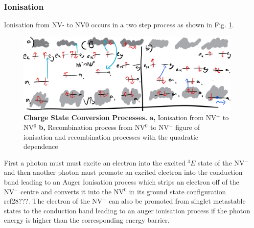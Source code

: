 \documentclass[preprint,prl]{revtex4}
\begin{document}
\subsubsection{Ionisation}
Ionisation from NV- to NV0 occurs in a two step process as shown in Fig. \ref{FigChargeConversion}.

\begin{figure}[H]
  \centering
  \includegraphics[width=1\textwidth]{ChargeConversion.png} 
 \caption{\textbf{Charge State Conversion Processes.} \textbf{a,} Ionisation from NV$^-$ to NV$^0$ \textbf{b,} Recombination process from NV$^0$ to NV$^-$ figure of ionisation and recombination processes with the quadratic dependence} \label{FigChargeConversion}
\end{figure}

First a photon must must excite an electron into the excited $^3E$ state of the NV$^-$ and then another photon must promote an excited electron into the conduction band leading to an Auger Ionisation process which strips an electron off of the NV$^-$ centre and converts it into the NV$^0$ in its ground state configuration ref28???. The electron of the NV$^-$ can also be promoted from singlet metastable states to the conduction band leading to an auger ionisation process if the photon energy is higher than the corresponding energy barrier.
\end{document}
